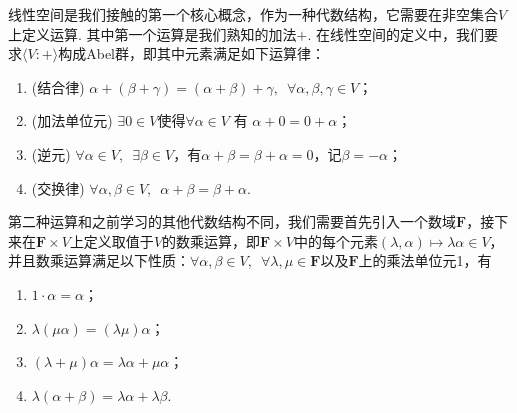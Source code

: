 线性空间是我们接触的第一个核心概念，作为一种代数结构，它需要在非空集合$V$上定义运算. 其中第一个运算是我们熟知的加法$+$. 在线性空间的定义中，我们要求$\langle V:+\rangle$构成Abel群，即其中元素满足如下运算律：
\begin{enumerate}
    \item (结合律) $\alpha+(\beta+\gamma)=(\alpha+\beta)+\gamma,\enspace\forall \alpha,\beta,\gamma \in V$；

    \item (加法单位元) $\exists 0 \in V$使得$\forall\alpha\in V$ 有 $\alpha+0=0+\alpha$；

    \item (逆元) $\forall\alpha\in V,\enspace \exists \beta \in V$，有$\alpha+\beta=\beta+\alpha=0$，记$\beta=-\alpha$；

    \item (交换律) $\forall\alpha, \beta\in V,\enspace \alpha+\beta=\beta+\alpha$.
\end{enumerate}

第二种运算和之前学习的其他代数结构不同，我们需要首先引入一个数域$\mathbf{F}$，接下来在$\mathbf{F}\times V$上定义取值于$V$的数乘运算，即$\mathbf{F}\times V$中的每个元素$(\lambda,\alpha)\mapsto \lambda\alpha\in V$，并且数乘运算满足以下性质：$\forall \alpha,\beta \in V,\enspace\forall \lambda,\mu\in\mathbf{F}$以及$\mathbf{F}$上的乘法单位元1，有
\begin{enumerate}
    \item $1\cdot \alpha=\alpha$；

    \item $\lambda(\mu\alpha)=(\lambda\mu)\alpha$；

    \item $(\lambda+\mu)\alpha=\lambda\alpha+\mu\alpha$；

    \item $\lambda(\alpha+\beta)=\lambda\alpha+\lambda\beta$.
\end{enumerate}

